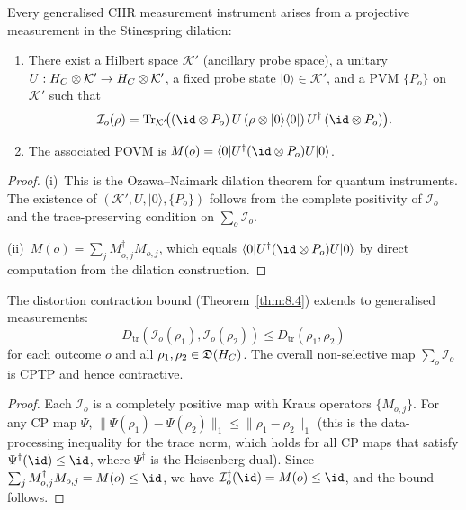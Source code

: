 \begin{lemma}
\label{lem:8.8}
Every generalised CIIR measurement instrument arises from a projective
measurement in the Stinespring dilation:
\begin{enumerate}
  \item[\textup{(i)}] There exist a Hilbert space $\mathcal{K}'$
    \textup{(}ancillary probe space\textup{)}, a unitary
    $U : H_C \otimes \mathcal{K}' \to H_C \otimes \mathcal{K}'$,
    a fixed probe state $|0\rangle \in \mathcal{K}'$, and a PVM
    $\{P_o\}$ on $\mathcal{K}'$ such that
    \[
      \mathcal{I}_o(\rho)
      = \Tr_{\mathcal{K}'}\!\bigl(
        (\id \otimes P_o)\,U\,(\rho \otimes |0\rangle\langle 0|)
        \,U^\dagger\,(\id \otimes P_o)
      \bigr).
    \]
  \item[\textup{(ii)}] The associated POVM is
    $M(o) = \langle 0|U^\dagger(\id \otimes P_o)U|0\rangle$.
\end{enumerate}
\end{lemma}

\begin{proof}
(i)~This is the Ozawa--Naimark dilation theorem for quantum
instruments.  The existence of $(\mathcal{K}', U, |0\rangle, \{P_o\})$
follows from the complete positivity of $\mathcal{I}_o$ and the
trace-preserving condition on $\sum_o \mathcal{I}_o$.

(ii)~$M(o) = \sum_j M_{o,j}^\dagger M_{o,j}$, which equals
$\langle 0|U^\dagger(\id \otimes P_o)U|0\rangle$ by direct
computation from the dilation construction.
\end{proof}

\begin{proposition}
\label{prop:8.4}
The distortion contraction bound
\textup{(}Theorem~\textup{\ref{thm:8.4})} extends to generalised
measurements:
\[
  D_{\mathrm{tr}}(\mathcal{I}_o(\rho_1), \mathcal{I}_o(\rho_2))
  \leq D_{\mathrm{tr}}(\rho_1, \rho_2)
\]
for each outcome $o$ and all $\rho_1, \rho_2 \in \mathfrak{D}(H_C)$.
The overall non-selective map $\sum_o \mathcal{I}_o$ is CPTP and hence
contractive.
\end{proposition}

\begin{proof}
Each $\mathcal{I}_o$ is a completely positive map with Kraus operators
$\{M_{o,j}\}$.  For any CP map $\Psi$,
$\|\Psi(\rho_1) - \Psi(\rho_2)\|_1 \leq \|\rho_1 - \rho_2\|_1$
(this is the data-processing inequality for the trace norm, which holds
for all CP maps that satisfy $\Psi^\dagger(\id) \leq \id$, where
$\Psi^\dagger$ is the Heisenberg dual).  Since
$\sum_j M_{o,j}^\dagger M_{o,j} = M(o) \leq \id$, we have
$\mathcal{I}_o^\dagger(\id) = M(o) \leq \id$, and the bound follows.
\end{proof}

